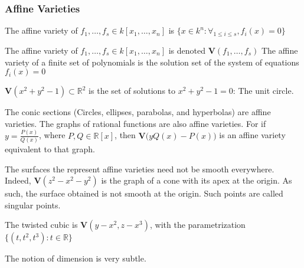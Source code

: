             \subsubsection{Affine Varieties}
                \begin{definition}
                    The affine variety of
                    $f_{1},\hdots,f_{s}\in{k}[x_{1},\hdots,x_{n}]$
                    is
                    $\{x\in{k^{n}}:\forall_{1\leq{i}\leq{s}},f_i(x)=0\}$
                \end{definition}
                The affine variety of
                $f_{1},\hdots,f_{s}\in k[x_{1},\hdots,x_{n}]$ is denoted
                $\mathbf{V}(f_1,\hdots, f_s)$ The affine variety of a finite set
                of polynomials is the solution set of the system of equations
                $f_{i}(x)=0$
                \begin{example}
                    $\mathbf{V}(x^2+y^2-1)\subset\mathbb{R}^2$
                    is the set of solutions to $x^2+y^2-1 = 0$: The unit circle.
                \end{example}
                \begin{example}
                    The conic sections
                    (Circles, ellipses, parabolas, and hyperbolas)
                    are affine varieties. The graphs of rational
                    functions are also affine varieties.
                    For if $y = \frac{P(x)}{Q(x)}$, where
                    $P,Q\in \mathbb{R}[x]$, then
                    $\mathbf{V}\big(yQ(x)-P(x)\big)$ is an
                    affine variety equivalent to that graph.
                \end{example}
                \begin{example}
                    The surfaces the represent affine varieties
                    need not be smooth everywhere. Indeed,
                    $\mathbf{V}(z^2-x^2-y^2)$ is the graph of a cone
                    with its apex at the origin. As such, the surface
                    obtained is not smooth at the origin. Such points
                    are called singular points.
                \end{example}
                \begin{example}
                    The twisted cubic is $\mathbf{V}(y-x^2,z-x^3)$,
                    with the parametrization $\{(t,t^2,t^3):t\in\mathbb{R}\}$
                \end{example}
                The notion of dimension is very subtle.

